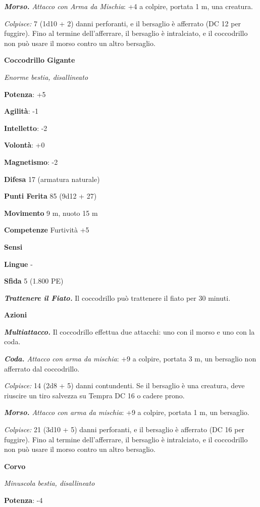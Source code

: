 \begin{multicols}{2}
\emph{\textbf{Morso.} Attacco con Arma da Mischia}: +4 a colpire,
portata 1 m, una creatura.

\emph{Colpisce:} 7 (1d10 + 2) danni perforanti, e il bersaglio è
afferrato (DC 12 per fuggire). Fino al termine dell'afferrare, il
bersaglio è intralciato, e il coccodrillo non può usare il morso contro
un altro bersaglio.

\textbf{Coccodrillo Gigante}

\emph{Enorme bestia, disallineato}

\textbf{Potenza}: +5

\textbf{Agilità}: -1

\textbf{Intelletto}: -2

\textbf{Volontà}: +0

\textbf{Magnetismo}: -2

\textbf{Difesa} 17 (armatura naturale)

\textbf{Punti Ferita} 85 (9d12 + 27)

\textbf{Movimento} 9 m, nuoto 15 m

\textbf{Competenze} Furtività +5

\textbf{Sensi} 

\textbf{Lingue} -

\textbf{Sfida} 5 (1.800 PE)\smallskip

\emph{\textbf{Trattenere il Fiato.}} Il coccodrillo può trattenere il
fiato per 30 minuti.

\smallskip\textbf{Azioni}

\emph{\textbf{Multiattacco.}} Il coccodrillo effettua due attacchi: uno
con il morso e uno con la coda.

\emph{\textbf{Coda.} Attacco con arma da mischia}: +9 a colpire, portata
3 m, un bersaglio non afferrato dal coccodrillo.

\emph{Colpisce:} 14 (2d8 + 5) danni contundenti. Se il bersaglio è una
creatura, deve riuscire un tiro salvezza su Tempra DC 16 o cadere prono.

\emph{\textbf{Morso.} Attacco con arma da mischia}: +9 a colpire,
portata 1 m, un bersaglio.

\emph{Colpisce:} 21 (3d10 + 5) danni perforanti, e il bersaglio è
afferrato (DC 16 per fuggire). Fino al termine dell'afferrare, il
bersaglio è intralciato, e il coccodrillo non può usare il morso contro
un altro bersaglio.

\textbf{Corvo}

\emph{Minuscola bestia, disallineato}

\textbf{Potenza}: -4


\end{multicols}
